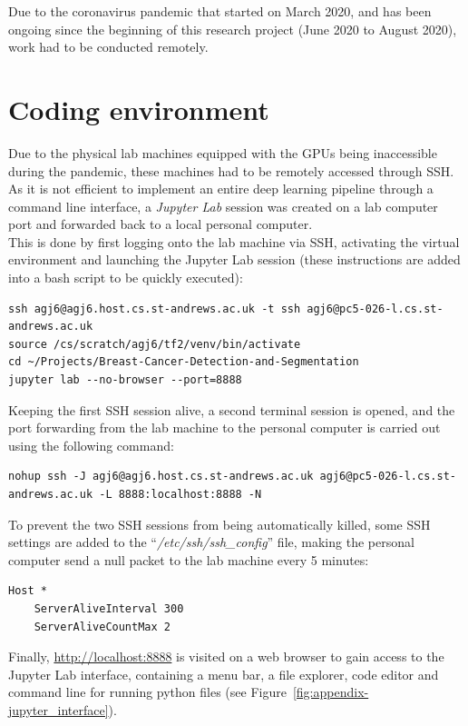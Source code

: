 Due to the coronavirus pandemic that started on March 2020, and has been ongoing since the beginning of this research project (June 2020 to August 2020), work had to be conducted remotely.

\section{Coding environment}

Due to the physical lab machines equipped with the GPUs being inaccessible during the pandemic, these machines had to be remotely accessed through SSH. As it is not efficient to implement an entire deep learning pipeline through a command line interface, a \textit{Jupyter Lab} session was created on a lab computer port and forwarded back to a local personal computer.\\

This is done by first logging onto the lab machine via SSH, activating the virtual environment and launching the Jupyter Lab session (these instructions are added into a bash script to be quickly executed):

\begin{lstlisting}
ssh agj6@agj6.host.cs.st-andrews.ac.uk -t ssh agj6@pc5-026-l.cs.st-andrews.ac.uk
source /cs/scratch/agj6/tf2/venv/bin/activate
cd ~/Projects/Breast-Cancer-Detection-and-Segmentation
jupyter lab --no-browser --port=8888
\end{lstlisting}

Keeping the first SSH session alive, a second terminal session is opened, and the port forwarding from the lab machine  to the personal computer is carried out using  the following command:

\begin{lstlisting}
nohup ssh -J agj6@agj6.host.cs.st-andrews.ac.uk agj6@pc5-026-l.cs.st-andrews.ac.uk -L 8888:localhost:8888 -N
\end{lstlisting}

To prevent the two SSH sessions from being automatically killed, some SSH settings are added to the ``\textit{/etc/ssh/ssh\_config}'' file, making the personal computer send a null packet to the lab machine every 5 minutes:

\begin{lstlisting}
Host *
    ServerAliveInterval 300
    ServerAliveCountMax 2
\end{lstlisting}

Finally, \url{http://localhost:8888}  is visited on a web browser to gain access to  the Jupyter Lab interface, containing a menu bar, a file explorer, code editor and command line for running python files (see Figure~\ref{fig:appendix-jupyter_interface}).

